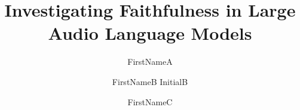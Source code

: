 \documentclass{Interspeech}
\title{Investigating Faithfulness in Large Audio Language Models}
\author[affiliation={1}, orcid=0000-0000-0000-0000, equalcontribution]{FirstNameA}{LastNameA}
\author[affiliation={2,3}, orcid=0000-0000-0000-1111, equalcontribution, correspondingauthor]{FirstNameB InitialB}{LastNameB}
\author[affiliation={1,3}]{FirstNameC}{LastNameC}
\begin{document}
\maketitle

\begin{abstract}






\end{abstract}
\end{document}
